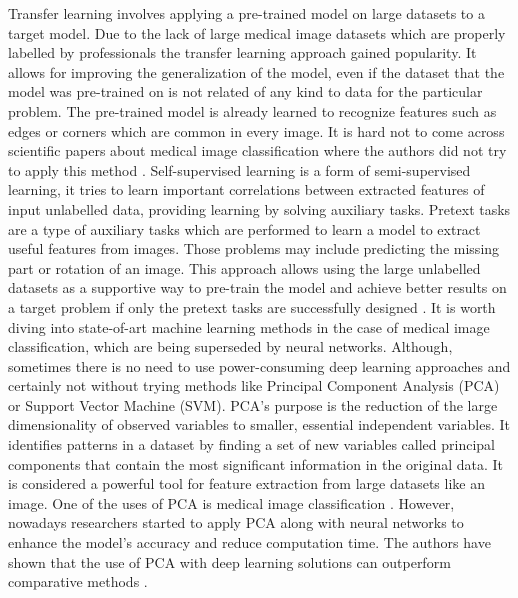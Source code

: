 \documentclass[runningheads]{llncs}
\begin{document}
\indent
Transfer learning involves applying a pre-trained model on large datasets to a target model. Due to the lack of large medical image datasets which are properly labelled by professionals the transfer learning approach gained popularity. It allows for improving the generalization of the model, even if the dataset that the model was pre-trained on is not related of any kind to data for the particular problem. The pre-trained model is already learned to recognize features such as edges or corners which are common in every image. It is hard not to come across scientific papers about medical image classification where the authors did not try to apply this method \cite{TransferLearningCOVID19}.
\newline
\indent
Self-supervised learning is a form of semi-supervised learning, it tries to learn important correlations between extracted features of input unlabelled data, providing learning by solving auxiliary tasks. Pretext tasks are a type of auxiliary tasks which are performed to learn a model to extract useful features from images. Those problems may include predicting the missing part or rotation of an image. This approach allows using the large unlabelled datasets as a supportive way to pre-train the model and achieve better results on a target problem if only the pretext tasks are successfully designed \cite{SelfSupervisedLearnig}.
\newline
\indent
It is worth diving into state-of-art machine learning methods in the case of medical image classification, which are being superseded by neural networks. Although, sometimes there is no need to use power-consuming deep learning approaches and certainly not without trying methods like Principal Component Analysis (PCA) or Support Vector Machine (SVM).  
\newline
\indent
PCA's purpose is the reduction of the large dimensionality of observed variables to smaller, essential independent variables. It identifies patterns in a dataset by finding a set of new variables called principal components that contain the most significant information in the original data. It is considered a powerful tool for feature extraction from large datasets like an image. One of the uses of PCA is medical image classification \cite{PCA1}. However, nowadays researchers started to apply PCA along with neural networks to enhance the model's accuracy and reduce computation time. The authors have shown that the use of PCA with deep learning solutions can outperform comparative methods \cite{PCA2}.  
\newline
\end{document}
